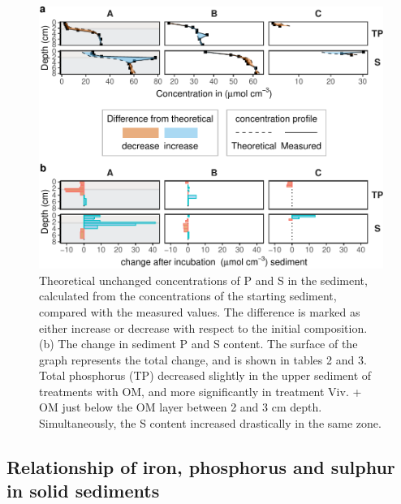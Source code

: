 \documentclass[12pt,twoside]{book}
\begin{document}
\begin{figure}
\centering
\includegraphics{my-thesis_files/figure-latex/IncubationChange-1.pdf}
\caption{\label{fig:IncubationChange}Theoretical unchanged concentrations of P and S in the sediment, calculated from the concentrations of the starting sediment, compared with the measured values. The difference is marked as either increase or decrease with respect to the initial composition. (b) The change in sediment P and S content. The surface of the graph represents the total change, and is shown in tables 2 and 3. Total phosphorus (TP) decreased slightly in the upper sediment of treatments with OM, and more significantly in treatment Viv. + OM just below the OM layer between 2 and 3 cm depth. Simultaneously, the S content increased drastically in the same zone.}
\end{figure}

\subsection{Relationship of iron, phosphorus and sulphur in solid sediments}\label{relationship-of-iron-phosphorus-and-sulphur-in-solid-sediments}
\end{document}
